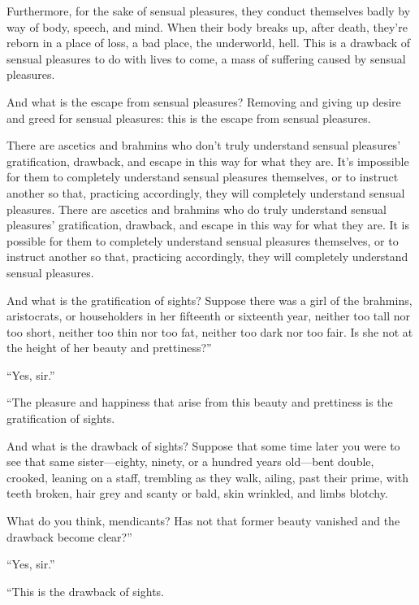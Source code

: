 \documentclass[12pt,openany]{book}%
\begin{document}
Furthermore, for the sake of sensual pleasures, they conduct themselves badly by way of body, speech, and mind. When their body breaks up, after death, they’re reborn in a place of loss, a bad place, the underworld, hell. This is a drawback of sensual pleasures to do with lives to come, a mass of suffering caused by sensual pleasures. 

And what is the escape from sensual pleasures? Removing and giving up desire and greed for sensual pleasures: this is the escape from sensual pleasures. 

There are ascetics and brahmins who don’t truly understand sensual pleasures’ gratification, drawback, and escape in this way for what they are. It’s impossible for them to completely understand sensual pleasures themselves, or to instruct another so that, practicing accordingly, they will completely understand sensual pleasures. There are ascetics and brahmins who do truly understand sensual pleasures’ gratification, drawback, and escape in this way for what they are. It is possible for them to completely understand sensual pleasures themselves, or to instruct another so that, practicing accordingly, they will completely understand sensual pleasures. 

And what is the gratification of sights? Suppose there was a girl of the brahmins, aristocrats, or householders in her fifteenth or sixteenth year, neither too tall nor too short, neither too thin nor too fat, neither too dark nor too fair. Is she not at the height of her beauty and prettiness?” 

“Yes, sir.” 

“The pleasure and happiness that arise from this beauty and prettiness is the gratification of sights. 

And what is the drawback of sights? Suppose that some time later you were to see that same sister—eighty, ninety, or a hundred years old—bent double, crooked, leaning on a staff, trembling as they walk, ailing, past their prime, with teeth broken, hair grey and scanty or bald, skin wrinkled, and limbs blotchy. 

What do you think, mendicants? Has not that former beauty vanished and the drawback become clear?” 

“Yes, sir.” 

“This is the drawback of sights. 
\end{document}
